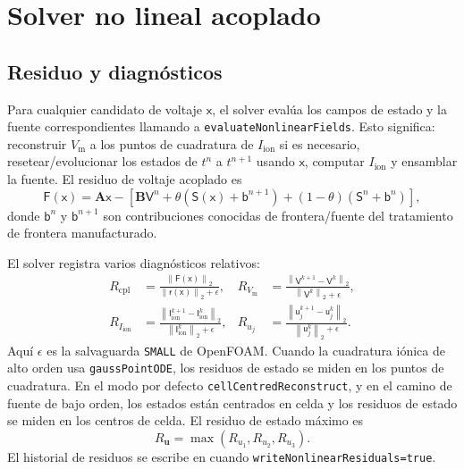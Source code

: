 \documentclass[11pt,a4paper]{article}
\newcommand{\code}[1]{\texttt{\small #1}}
\newcommand{\Vm}{V_{\text{m}}}
\newcommand{\Iion}{I_{\mathrm{ion}}}
\newcommand{\Aimp}{\mathbf{A}}
\newcommand{\Bimp}{\mathbf{B}}
\newcommand{\Fres}{\mathsf{F}}
\newcommand{\norm}[1]{\left\lVert #1 \right\rVert}
\begin{document}
\section{Solver no lineal acoplado}

\subsection{Residuo y diagnósticos}

Para cualquier candidato de voltaje $\mathsf{x}$, el solver evalúa los campos de estado y la
fuente correspondientes llamando a \code{evaluateNonlinearFields}. Esto significa:
reconstruir $\Vm$ a los puntos de cuadratura de $\Iion$ si es necesario, resetear/evolucionar
los estados de $t^n$ a $t^{n+1}$ usando $\mathsf{x}$, computar $\Iion$ y ensamblar la fuente.
El residuo de voltaje acoplado es
\begin{equation}
  \Fres(\mathsf{x})
  =
  \Aimp\mathsf{x}
  -
  \left[
    \Bimp\mathsf{V}^{n}
    +\theta\left(\mathsf{S}(\mathsf{x})+\mathsf{b}^{n+1}\right)
    +(1-\theta)\left(\mathsf{S}^{n}+\mathsf{b}^{n}\right)
  \right],
  \label{eq:nonlinear-residual}
\end{equation}
donde $\mathsf{b}^{n}$ y $\mathsf{b}^{n+1}$ son contribuciones conocidas de
frontera/fuente del tratamiento de frontera manufacturado.

El solver registra varios diagnósticos relativos:
\begin{align}
  R_{\mathrm{cpl}} &=
  \frac{\norm{\Fres(\mathsf{x})}_2}
       {\norm{\mathsf{r}(\mathsf{x})}_2+\epsilon},
  &
  R_{\Vm} &=
  \frac{\norm{\mathsf{V}^{k+1}-\mathsf{V}^{k}}_2}
       {\norm{\mathsf{V}^{k}}_2+\epsilon},\\
  R_{\Iion} &=
  \frac{\norm{\mathsf{I}^{k+1}_{\mathrm{ion}}-\mathsf{I}^{k}_{\mathrm{ion}}}_2}
       {\norm{\mathsf{I}^{k}_{\mathrm{ion}}}_2+\epsilon},
  &
  R_{u_j} &=
  \frac{\norm{\mathsf{u}^{k+1}_{j}-\mathsf{u}^{k}_{j}}_2}
       {\norm{\mathsf{u}^{k}_{j}}_2+\epsilon}.
\end{align}
Aquí $\epsilon$ es la salvaguarda \code{SMALL} de OpenFOAM. Cuando la cuadratura iónica de
alto orden usa \code{gaussPointODE}, los residuos de estado se miden en los puntos de
cuadratura. En el modo por defecto \code{cellCentredReconstruct}, y en el camino de fuente de
bajo orden, los estados están centrados en celda y los residuos de estado se
miden en los centros de celda. El residuo de estado máximo es
\begin{equation}
  R_{\mathbf{u}}=\max(R_{u_1},R_{u_2},R_{u_3}).
\end{equation}
El historial de residuos se escribe en
 cuando
\code{writeNonlinearResiduals=true}.
\end{document}
